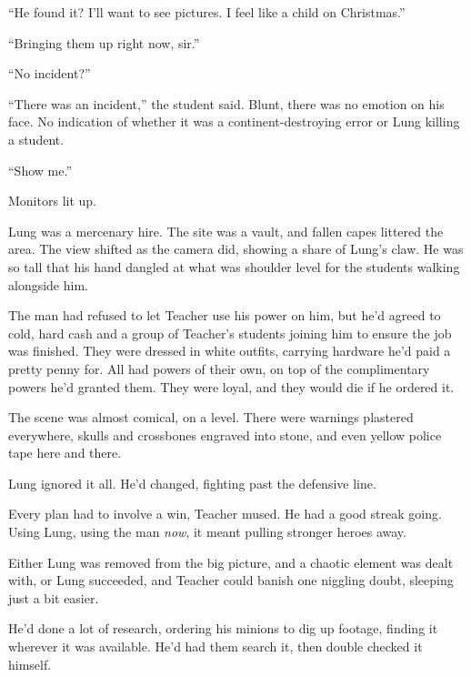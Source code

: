 ``He found it?  I'll want to see pictures.  I feel like a child on Christmas.''



``Bringing them up right now, sir.''



``No incident?''



``There was an incident,'' the student said.  Blunt, there was no emotion on his face.  No indication of whether it was a continent-destroying error or Lung killing a student.



``Show me.''



Monitors lit up.



Lung was a mercenary hire.  The site was a vault, and fallen capes littered the area.  The view shifted as the camera did, showing a share of Lung's claw.  He was so tall that his hand dangled at what was shoulder level for the students walking alongside him.



The man had refused to let Teacher use his power on him, but he'd agreed to cold, hard cash and a group of Teacher's students joining him to ensure the job was finished.  They were dressed in white outfits, carrying hardware he'd paid a pretty penny for.  All had powers of their own, on top of the complimentary powers he'd granted them.  They were loyal, and they would die if he ordered it.



The scene was almost comical, on a level.  There were warnings plastered everywhere, skulls and crossbones engraved into stone, and even yellow police tape here and there.



Lung ignored it all.  He'd changed, fighting past the defensive line.



Every plan had to involve a win, Teacher mused.  He had a good streak going.  Using Lung, using the man \emph{now}, it meant pulling stronger heroes away.



Either Lung was removed from the big picture, and a chaotic element was dealt with, or Lung succeeded, and Teacher could banish one niggling doubt, sleeping just a bit easier.



He'd done a lot of research, ordering his minions to dig up footage, finding it wherever it was available.  He'd had them search it, then double checked it himself.



